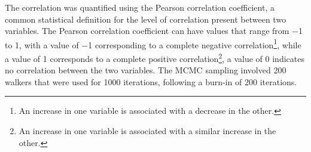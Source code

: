 The correlation was quantified using the Pearson correlation coefficient\autocite{pearson_notes_1895}, a common statistical definition for the level of correlation present between two variables.
The Pearson correlation coefficient can have values that range from \num{-1} to \num{1}, with a value of \num{-1} corresponding to a complete negative correlation\footnote{An increase in one variable is associated with a decrease in the other.}, while a value of \num{1} corresponds to a complete positive correlation\footnote{An increase in one variable is associated with a similar increase in the other.}, a value of \num{0} indicates no correlation between the two variables.
The MCMC sampling involved 200 walkers that were used for 1000 iterations, following a burn-in of 200 iterations.
